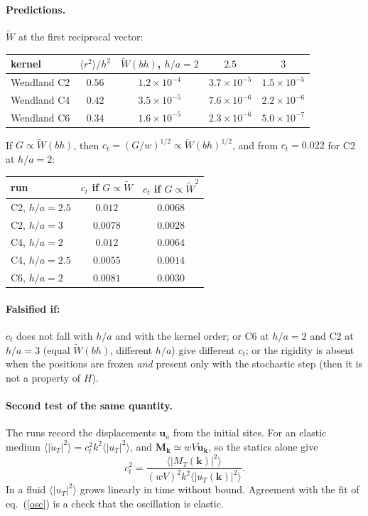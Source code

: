 \documentclass[11pt,aps,preprint,nofootinbib,superscriptaddress,tightenlines]{revtex4-2}
\def\st{\begin{equation}}
\def\stp{\end{equation}}
\def\Eq#1{eq.~(\ref{#1})}
\newcommand{\avg}[1]{\langle #1\rangle}
\let\oldparagraph\paragraph
\renewcommand{\paragraph}{\par\bigskip\oldparagraph}
\begin{document}
\paragraph{Predictions.}  $\tilde W$ at the first reciprocal vector:
\begin{center}
\begin{tabular}{lcccc}
\hline
kernel & $\avg{r^2}/h^2$ & $\tilde W(bh)$, $h/a=2$ & $2.5$ & $3$ \\ \hline
Wendland C2 & $0.56$ & $1.2\times10^{-4}$ & $3.7\times10^{-5}$ & $1.5\times10^{-5}$ \\
Wendland C4 & $0.42$ & $3.5\times10^{-5}$ & $7.6\times10^{-6}$ & $2.2\times10^{-6}$ \\
Wendland C6 & $0.34$ & $1.6\times10^{-5}$ & $2.3\times10^{-6}$ & $5.0\times10^{-7}$ \\
\hline
\end{tabular}
\end{center}
If $G\propto\tilde W(bh)$, then $c_t=(G/w)^{1/2}\propto\tilde W(bh)^{1/2}$, and from $c_t=0.022$
for C2 at $h/a=2$:
\begin{center}
\begin{tabular}{lcc}
\hline
run & $c_t$ if $G\propto\tilde W$ & $c_t$ if $G\propto\tilde W^2$ \\ \hline
C2, $h/a=2.5$ & $0.012$ & $0.0068$ \\
C2, $h/a=3$ & $0.0078$ & $0.0028$ \\
C4, $h/a=2$ & $0.012$ & $0.0064$ \\
C4, $h/a=2.5$ & $0.0055$ & $0.0014$ \\
C6, $h/a=2$ & $0.0081$ & $0.0030$ \\
\hline
\end{tabular}
\end{center}
\paragraph{Falsified if:} $c_t$ does not fall with $h/a$ and with the kernel order; or C6 at
$h/a=2$ and C2 at $h/a=3$ (equal $\tilde W(bh)$, different $h/a$) give different $c_t$; or the
rigidity is absent when the positions are frozen \emph{and} present only with the stochastic
step (then it is not a property of $H$).

\paragraph{Second test of the same quantity.}  The runs record the displacements $\bm u_a$
from the initial sites.  For an elastic medium $\avg{|\dot u_T|^2}=c_t^2k^2\avg{|u_T|^2}$, and
$\bm M_{\bm k}\simeq wV\dot{\bm u}_{\bm k}$, so the statics alone give
\st
c_t^2=\frac{\avg{|M_T(\bm k)|^2}}{(wV)^2k^2\avg{|u_T(\bm k)|^2}} .
\stp
In a fluid $\avg{|u_T|^2}$ grows linearly in time without bound.  Agreement with the fit of
\Eq{osc} is a check that the oscillation is elastic.
\end{document}
